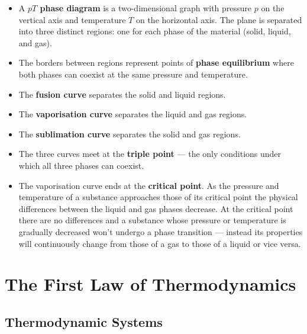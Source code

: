 \documentclass{article}
\begin{document}
\begin{itemize}
  \item A \textbf{$p T$ phase diagram} is a two-dimensional graph with pressure $p$ on the vertical axis and temperature $T$ on the horizontal axis. The plane is separated into three distinct regions: one for each phase of the material (solid, liquid, and gas).

  \item The borders between regions represent points of \textbf{phase equilibrium} where both phases can coexist at the same pressure and temperature.

  \item The \textbf{fusion curve} separates the solid and liquid regions.

  \item The \textbf{vaporisation curve} separates the liquid and gas regions.

  \item The \textbf{sublimation curve} separates the solid and gas regions.

  \item The three curves meet at the \textbf{triple point} — the only conditions under which all three phases can coexist.

  \item The vaporisation curve ends at the \textbf{critical point}. As the pressure and temperature of a substance approaches those of its critical point the physical differences between the liquid and gas phases decrease. At the critical point there are no differences and a substance whose pressure or temperature is gradually decreased won't undergo a phase transition — instead its properties will continuously change from those of a gas to those of a liquid or vice versa.
\end{itemize}

\section{The First Law of Thermodynamics}

\subsection{Thermodynamic Systems}
\end{document}
